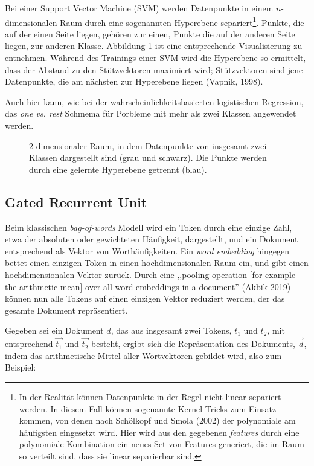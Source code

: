 Bei einer Support Vector Machine (SVM) werden Datenpunkte in einem $n$-dimensionalen Raum durch eine sogenannten Hyperebene separiert\footnote{In der Realität können Datenpunkte in der Regel nicht linear separiert werden. In diesem Fall können sogenannte Kernel Tricks zum Einsatz kommen, von denen nach Schölkopf und Smola (2002) der polynomiale am häufigsten eingesetzt wird. Hier wird aus den gegebenen \textit{features} durch eine polynomiale Kombination ein neues Set von Features generiert, die im Raum so verteilt sind, dass sie linear separierbar sind.}. Punkte, die auf der einen Seite liegen, gehören zur einen, Punkte die auf der anderen Seite liegen, zur anderen Klasse. Abbildung \ref{fig:svm} ist eine entsprechende Visualisierung zu entnehmen. Während des Trainings einer SVM wird die Hyperebene so ermittelt, dass der Abstand zu den Stützvektoren maximiert wird; Stützvektoren sind jene Datenpunkte, die am nächsten zur Hyperebene liegen (Vapnik, 1998).

Auch hier kann, wie bei der wahrscheinlichkeitsbasierten logistischen Regression, das \textit{one vs. rest} Schmema für Porbleme mit mehr als zwei Klassen angewendet werden.


\begin{figure}
  \centering
  
  \caption{2-dimensionaler Raum, in dem Datenpunkte von insgesamt zwei Klassen dargestellt sind (grau und schwarz). Die Punkte werden durch eine gelernte Hyperebene getrennt (blau).}
  \label{fig:svm}
  \end{figure}

\subsection{Gated Recurrent Unit}
\label{featurebasedbert}
Beim klassischen \textit{bag-of-words} Modell wird ein Token durch eine einzige Zahl, etwa der absoluten oder gewichteten Häufigkeit, dargestellt, und ein Dokument entsprechend als Vektor von Worthäufigkeiten. Ein \textit{word embedding} hingegen bettet einen einzigen Token in einen hochdimensionalen Raum ein, und gibt einen hochdimensionalen Vektor zurück. Durch eine ,,pooling operation [for example the arithmetic mean] over all word embeddings in a document'' (Akbik 2019) können nun alle Tokens auf einen einzigen Vektor reduziert werden, der das gesamte Dokument repräsentiert.

Gegeben sei ein Dokument $d$, das aus insgesamt zwei Tokens, $t_{1}$ und $t_{2}$, mit entsprechend $\vec{t_{1}}$ und $\vec{t_{2}}$ besteht, ergibt sich die Repräsentation des Dokuments, $\vec{d}$, indem das arithmetische Mittel aller Wortvektoren gebildet wird, also zum Beispiel:

